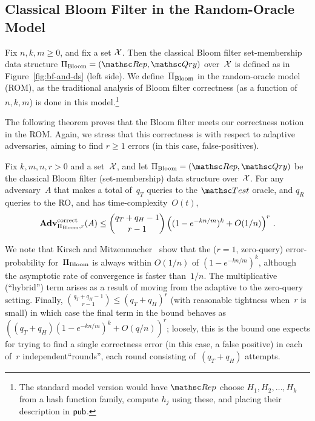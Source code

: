 \subsection{Classical Bloom Filter in the Random-Oracle Model}
Fix $n,k,m \geq 0$, and fix a set ${\cal X}$.  Then the classical Bloom
filter set-membership data structure $\setprim_{\mathrm{Bloom}}=
(\Rep, \Qry)$ over~${\cal X}$ is defined as in
Figure~\ref{fig:bf-and-ds} (left side).  We
define~$\Pi_{\mathrm{Bloom}}$ in the random-oracle model
(ROM), as the traditional analysis of Bloom filter correctness (as a
function of $n,k,m$) is done in this model.\footnote{The standard
model version would have $\Rep$ choose $H_1,H_2,\ldots,H_k$ from a
hash function family, compute $h_j$ using these, and placing their
description in ${\sf pub}$.}

 The following theorem proves that the Bloom
filter meets our correctness notion in the ROM.  Again, we stress
that this correctness is with respect to adaptive adversaries,
aiming to find $r \geq 1$ errors (in this case, false-positives).


\begin{theorem}\label{thm3}\label{thm:bf-correctness}
Fix $k,m,n,r>0$ and a set~${\cal X}$, and let
$\setprim_{\mathrm{Bloom}}= (\Rep, \Qry)$ be the classical Bloom
filter (set-membership) data structure over~${\cal X}$. For any
adversary~$A$ that makes a total of~$q_T$ queries to the $\Test$
oracle, and $q_R$ queries to the RO, and has time-complexity~$O(t)$,
\[
\mathrm{\mathbf{Adv}}^{\mathrm{correct}}_{\Pi_{\mathrm{Bloom}},r}(A) \leq  {\dbinom{q_T + q_H-1}{r-1}} \left( (1-e^{-kn/m})^k + O(1/n) \right)^r\,.
\]
\end{theorem}
We note that Kirsch and Mitzenmacher~\cite{kirsch2006less} show
that the ($r=1$, zero-query) error-probability for~$\Pi_\mathrm{Bloom}$ is
always within $O(1/n)$ of $(1-e^{-kn/m})^k$, although the asymptotic
rate of convergence is faster than~$1/n$.  The multiplicative (``hybrid'') term arises as a result
of moving from the adaptive to the zero-query setting.
Finally, $\binom{q_T+q_H-1}{r-1} \leq (q_T+q_H)^r$ (with reasonable tightness when~$r$ is small) in
which case the final term in the bound behaves as
$((q_T+q_H) (1-e^{-kn/m})^k + O(q/n) )^r$; loosely, this is the bound one expects for
trying to find a single correctness error (in this case, a false positive) in each of~$r$ independent``rounds'', each round
consisting of~$(q_T+q_H)$ attempts.



